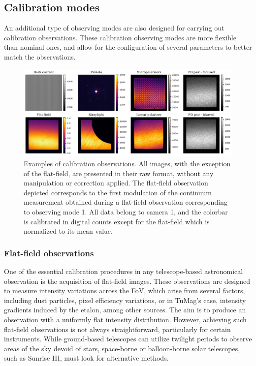 \subsection{Calibration modes}
An additional type of observing modes are also designed for carrying out calibration observations. These calibration observing modes are more flexible than nominal ones, and allow for the configuration of several parameters to better match the observations.

\begin{figure}[t]
    \includegraphics[width=\textwidth]{figures/Pipeline/cal_modes_examples.pdf}
    \caption[Calibration observation modes examples of TuMag.]{
      Examples of calibration observations. All images, with the exception of the flat-field, are presented in their raw format, without any manipulation or correction applied. The flat-field observation depicted corresponds to the first modulation of the continuum measurement obtained during a flat-field observation corresponding to observing mode 1. All data belong to camera 1, and the colorbar is calibrated in digital counts except for the flat-field which is normalized to its mean value. }
      \label{fig_pipeline: cal_examples}
\end{figure}

\subsubsection{Flat-field observations}

One of the essential calibration procedures in any telescope-based astronomical observation is the acquisition of flat-field images. These observations are designed to measure intensity variations across the FoV, which arise from several factors, including dust particles, pixel efficiency variations, or in TuMag's case, intensity gradients induced by the etalon, among other sources. The aim is to produce an observation with a uniformly flat intensity distribution. However, achieving such flat-field observations is not always straightforward, particularly for certain instruments. While ground-based telescopes can utilize twilight periods to observe areas of the sky devoid of stars, space-borne or balloon-borne solar telescopes, such as Sunrise III, must look for alternative methods. 

